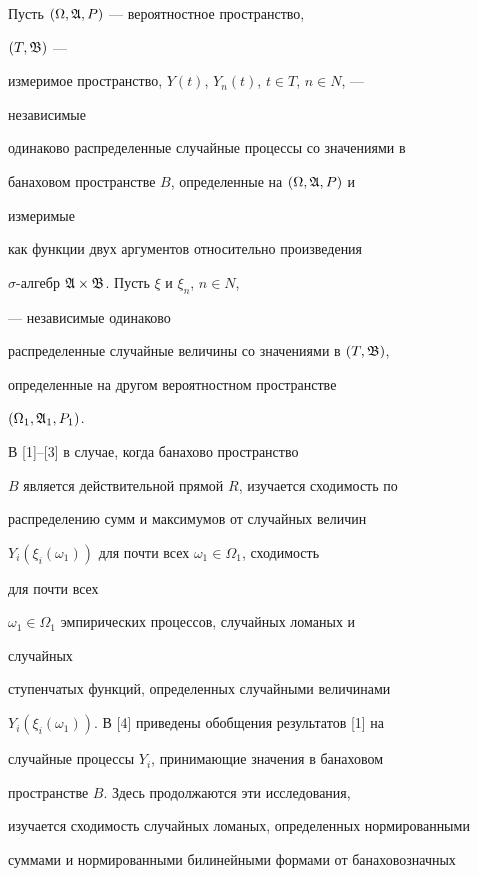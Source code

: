 \label{begin} 


 


Пусть $(\Omega,\frak A,P)$ --- вероятностное пространство, 


$(T,\frak B)$ --- 


измеримое пространство, $Y(t)$, $Y_n(t)$, $t\in T$, $n\in N$, --- 


независимые 


одинаково распределенные случайные процессы со значениями в 


банаховом пространстве $B$, определенные на $(\Omega,\frak A,P)$ и 


измеримые 


как функции двух аргументов относительно произведения 


$\sigma$-алгебр $\frak A\times\frak B$. Пусть $\xi$ и $\xi_n$, $n\in N$, 


--- независимые одинаково 


распределенные случайные величины со значениями в $(T,\frak B)$, 


определенные на другом вероятностном пространстве 


$(\Omega_1,\frak A_1,P_1)$. 


 


В [1]--[3] в случае, когда банахово пространство 


$B$ является действительной прямой $R$, изучается сходимость по 


распределению сумм и максимумов от случайных величин 


$Y_i(\xi_i(\omega_1))$ для почти всех $\omega_1\in\Omega_1$, сходимость 


для почти всех 


$\omega_1\in\Omega_1$ эмпирических процессов, случайных ломаных и 


случайных 


ступенчатых функций, определенных случайными величинами 


$Y_i(\xi_i(\omega_1))$. В [4] приведены обобщения результатов [1] на 


случайные процессы $Y_i$, принимающие значения в банаховом 


пространстве $B$. Здесь продолжаются эти исследования, 


изучается сходимость случайных ломаных, определенных нормированными 


суммами и нормированными билинейными формами от банаховозначных 


